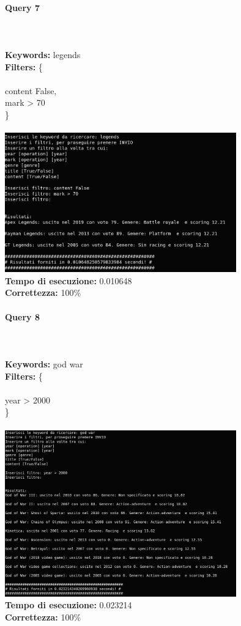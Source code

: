 \documentclass[12pt]{article}
\begin{document}
\paragraph{Query 7} ~ \\ \\

\noindent \textbf{Keywords: } legends \\
\textbf{Filters: } \{ \\ \\
\indent content False, \\
\indent mark > 70 \\
\} \\\\

\noindent \includegraphics[width=100mm]{Immagini/Image7.png} \\
\textbf{Tempo di esecuzione:} 0.010648 \\
\textbf{Correttezza:} 100\% \pagebreak

\paragraph{Query 8} ~ \\ \\

\noindent \textbf{Keywords: } god war \\
\textbf{Filters: } \{ \\ \\
\indent year > 2000 \\
\} \\\\

\noindent \includegraphics[width=100mm]{Immagini/Image8.png} \\
\textbf{Tempo di esecuzione:} 0.023214 \\
\textbf{Correttezza:} 100\% \pagebreak
\end{document}
